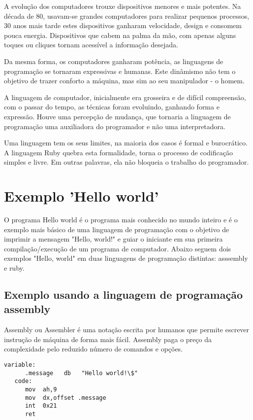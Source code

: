 \documentclass[espaco=simples,appendix=Name]{abnt}
\begin{document}
A evolução dos computadores trouxe dispositivos menores e mais potentes. Na década de 80, usavam-se grandes computadores para realizar pequenos processos, 30 anos mais tarde estes dispositivos ganharam velocidade, design e consomem pouca energia. Dispositivos que cabem na palma da mão, com apenas alguns toques ou cliques tornam acessível a informação desejada. 

Da mesma forma, os computadores ganharam potência, as linguagens de programação se tornaram expressivas e humanas. Este dinâmismo não tem o objetivo de trazer conforto a máquina, mas sim ao seu manipulador - o homem. 

A linguagem de computador, inicialmente era grosseira e de difícil compreensão, com o passar do tempo, as técnicas foram evoluindo, ganhando forma e expressão. Houve uma percepção de mudança, que tornaria a linguagem de programação uma auxiliadora do programador e não uma interpretadora.

Uma linguagem tem os seus limites, na maioria dos casos é formal e burocrático. A linguagem Ruby quebra esta formalidade, torna o processo de codificação simples e livre. Em outras palavras, ela não bloqueia o trabalho do programador.

\section{Exemplo 'Hello world'}

   O programa Hello world é o programa mais conhecido no mundo inteiro e é o exemplo mais básico de uma linguagem de programação com o objetivo de imprimir a mensagem "Hello, world!" e guiar o iniciante em sua primeira compilação/execução de um programa de computador. Abaixo seguem dois exemplos "Hello, world" em duas linguagens de programação distintas: asssembly e ruby.


\subsection {Exemplo usando a linguagem de programação assembly}

Assembly ou Assembler é uma notação escrita por humanos que permite escrever instrução de máquina de forma mais fácil. Assembly paga o preço da complexidade pelo reduzido número de comandos e opções.

\begin{lstlisting}[label=exemplo em assembly,caption=Exemplo em assembly]
   variable:
      .message   db   "Hello world!\$"
   code:
      mov  ah,9
      mov  dx,offset .message
      int  0x21
      ret
\end{lstlisting}
\end{document}
